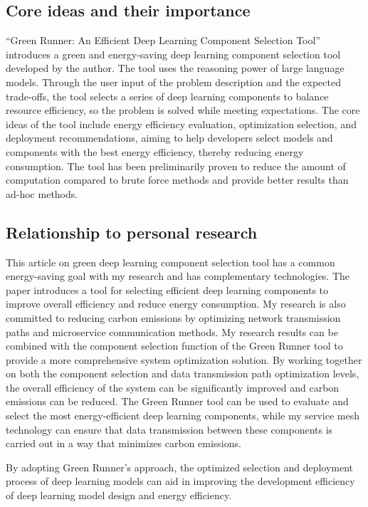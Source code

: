 \documentclass[11pt]{report}
\begin{document}
\subsection{Core ideas and their importance}
\label{subsec:coreideas2}

``Green Runner: An Efficient Deep Learning Component Selection Tool'' introduces a green and energy-saving deep learning component selection tool developed by the author. The tool uses the reasoning power of large language models. Through the user input of the problem description and the expected trade-offs, the tool selects a series of deep learning components to balance resource efficiency, so the problem is solved while meeting expectations. The core ideas of the tool include energy efficiency evaluation, optimization selection, and deployment recommendations, aiming to help developers select models and components with the best energy efficiency, thereby reducing energy consumption. The tool has been preliminarily proven to 
reduce the amount of computation compared to brute force methods and provide better results than ad-hoc methods.

\subsection{Relationship to personal research}
\label{subsec:relevance2}

This article on green deep learning component selection tool has a common energy-saving goal with my research and has complementary technologies. The paper introduces a tool for selecting efficient deep learning components to improve overall efficiency and reduce energy consumption. My research is also committed to reducing carbon emissions by optimizing network transmission paths and microservice communication methods. My research results can be combined with the component selection function of the Green Runner tool to provide a more comprehensive system optimization solution. By working together on both the component selection and data transmission path optimization levels, the overall efficiency of the system can be significantly improved and carbon emissions can be reduced. The Green Runner tool can be used to evaluate and select the most energy-efficient deep learning components, while my service mesh technology can ensure that data transmission between these components is carried out in a way that minimizes carbon emissions.

By adopting Green Runner's approach, the optimized selection and deployment process of deep learning models can aid in improving the development efficiency of deep learning model design and energy efficiency.
\end{document}
